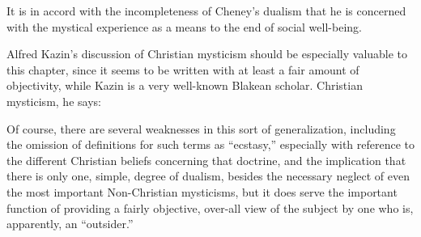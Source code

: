 It is in accord with the incompleteness of Cheney's
dualism that he is concerned with the mystical experience
as a means to the end of social well-being.\supercite{cheney:walked-with-god}

Alfred Kazin's discussion of Christian mysticism\supercite{kazin:portable-blake}
should be especially valuable to this chapter, since it seems to be
written with at least a fair amount of objectivity, while
Kazin is a very well-known Blakean scholar. Christian mysticism, he says:


\label{self:05}

Of course, there are several weaknesses in this sort of
generalization, including the omission of definitions for
such terms as \enquote{ecstasy,} especially with reference to the
different Christian beliefs concerning that doctrine, and
the implication that there is only one, simple, degree of
dualism, besides the necessary neglect of even the most important
Non-Christian mysticisms, but it does serve the important function
of providing a fairly objective, over-all view of the subject
by one who is, apparently, an \enquote{outsider.}

\label{self:15}

